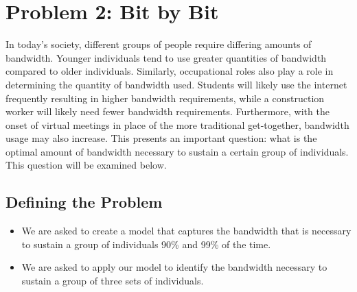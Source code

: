 \documentclass[12pt]{article}
\begin{document}
\section{Problem 2: Bit by Bit}

In today's society, different groups of people require differing amounts of bandwidth. Younger individuals tend to use greater quantities of bandwidth compared to older individuals. Similarly, occupational roles also play a role in determining the quantity of bandwidth used. Students will likely use the internet frequently resulting in higher bandwidth requirements, while a construction worker will likely need fewer bandwidth requirements. Furthermore, with the onset of virtual meetings in place of the more traditional get-together, bandwidth usage may also increase. This presents an important question: what is the optimal amount of bandwidth necessary to sustain a certain group of individuals. This question will be examined below.

\subsection{Defining the Problem}
\begin{itemize}
    \item We are asked to create a model that captures the bandwidth that is necessary to sustain a group of individuals 90\% and 99\% of the time.
    \item We are asked to apply our model to identify the bandwidth necessary to sustain a group of three sets of individuals.
\end{itemize}
\end{document}
